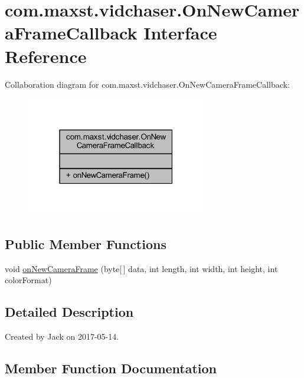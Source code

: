 \hypertarget{interfacecom_1_1maxst_1_1vidchaser_1_1_on_new_camera_frame_callback}{}\section{com.\+maxst.\+vidchaser.\+On\+New\+Camera\+Frame\+Callback Interface Reference}
\label{interfacecom_1_1maxst_1_1vidchaser_1_1_on_new_camera_frame_callback}


Collaboration diagram for com.\+maxst.\+vidchaser.\+On\+New\+Camera\+Frame\+Callback\+:\nopagebreak
\begin{figure}[H]
\begin{center}
\leavevmode
\includegraphics[width=223pt]{interfacecom_1_1maxst_1_1vidchaser_1_1_on_new_camera_frame_callback__coll__graph}
\end{center}
\end{figure}
\subsection*{Public Member Functions}
\begin{DoxyCompactItemize}
\item 
void \hyperlink{interfacecom_1_1maxst_1_1vidchaser_1_1_on_new_camera_frame_callback_ae69ef3264f4f6715f08b41ccec0dba76}{on\+New\+Camera\+Frame} (byte\mbox{[}$\,$\mbox{]} data, int length, int width, int height, int color\+Format)
\end{DoxyCompactItemize}


\subsection{Detailed Description}
Created by Jack on 2017-\/05-\/14. 

\subsection{Member Function Documentation}
\mbox{\label{interfacecom_1_1maxst_1_1vidchaser_1_1_on_new_camera_frame_callback_ae69ef3264f4f6715f08b41ccec0dba76}} 
